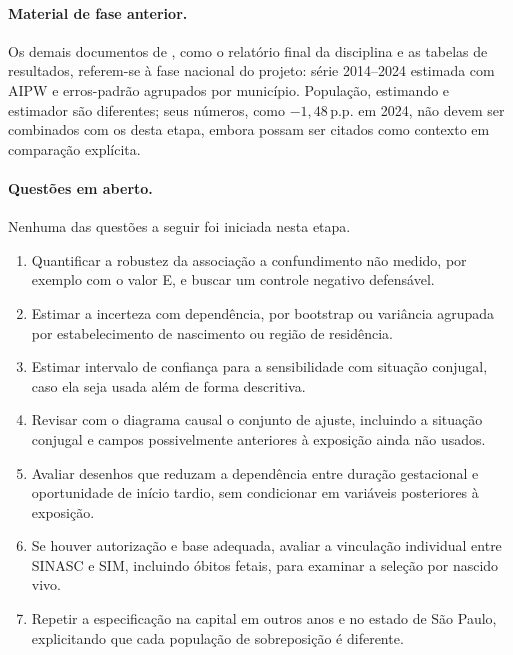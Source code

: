 \documentclass[11pt,a4paper]{article}
\newcommand{\pp}{\,p.p.}
\begin{document}
\paragraph{Material de fase anterior.} Os demais documentos de ,
como o relatório final da disciplina e as tabelas de resultados, referem-se à fase
nacional do projeto: série 2014--2024 estimada com AIPW e erros-padrão agrupados por
município. População, estimando e estimador são
diferentes; seus números, como $-1{,}48$\pp{} em 2024, não devem ser combinados com os
desta etapa, embora possam ser citados como contexto em comparação explícita.

\paragraph{Questões em aberto.} Nenhuma das questões a seguir foi iniciada nesta etapa.
\begin{enumerate}
\item Quantificar a robustez da associação a confundimento não medido, por exemplo com o
valor E, e buscar um controle negativo defensável.
\item Estimar a incerteza com dependência, por bootstrap ou variância agrupada por
estabelecimento de nascimento ou região de residência.
\item Estimar intervalo de confiança para a sensibilidade com situação conjugal, caso ela
seja usada além de forma descritiva.
\item Revisar com o diagrama causal o conjunto de ajuste, incluindo a situação conjugal e
campos possivelmente anteriores à exposição ainda não usados.
\item Avaliar desenhos que reduzam a dependência entre duração gestacional e oportunidade
de início tardio, sem condicionar em variáveis posteriores à exposição.
\item Se houver autorização e base adequada, avaliar a vinculação individual entre SINASC
e SIM, incluindo óbitos fetais, para examinar a seleção por nascido vivo.
\item Repetir a especificação na capital em outros anos e no estado de São Paulo,
explicitando que cada população de sobreposição é diferente.
\end{enumerate}

{\small{}}
\end{document}
